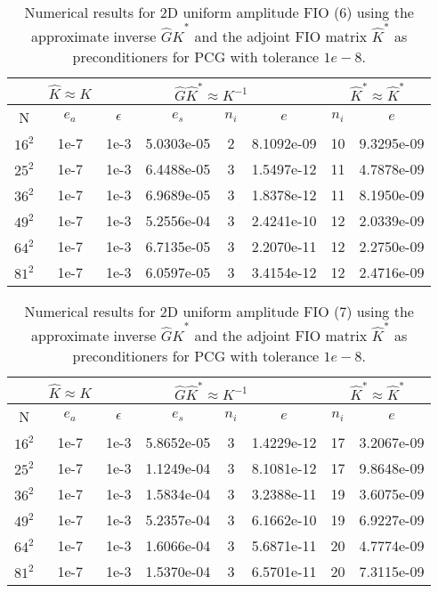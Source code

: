 \documentclass[11pt]{article}
\begin{document}
\begin{table}[!htbp]
\centering
\begin{tabular}{|c|c|c|c|c|c|c|c|}
\hline
\multicolumn{1}{c|}{}& \multicolumn{1}{c|}{$\hat{K} \approx K$} & \multicolumn{4}{c|}{$\hat{G}\hat{K}^{*}\approx K^{-1}$}& \multicolumn{2}{c|}{$\hat{K}^{*} \approx \hat{K}^{*}$}\\
\hline
N & $e_{a}$ & $\epsilon$ & $e_{s}$ & $n_{i}$ & $e$ & $n_{i}$ & $e$ \\ 
\hline
$16^2$ & 1e-7 & 1e-3 & 5.0303e-05 & 2 & 8.1092e-09 & 10 & 9.3295e-09 \\
\hline
$25^2$ & 1e-7 & 1e-3 & 6.4488e-05 & 3 & 1.5497e-12 & 11 & 4.7878e-09 \\
\hline
$36^2$ & 1e-7 & 1e-3 & 6.9689e-05 & 3 & 1.8378e-12 & 11 & 8.1950e-09 \\
\hline
$49^2$ & 1e-7 & 1e-3 & 5.2556e-04 & 3 & 2.4241e-10 & 12 & 2.0339e-09 \\
\hline
$64^2$ & 1e-7 & 1e-3 & 6.7135e-05 & 3 & 2.2070e-11 & 12 & 2.2750e-09 \\
\hline
$81^2$ & 1e-7 & 1e-3 & 6.0597e-05 & 3 & 3.4154e-12 & 12 & 2.4716e-09 \\

\end{tabular}

\caption{Numerical results for 2D uniform amplitude FIO (6) using the approximate inverse $\hat{G}\hat{K}^{*}$ and the adjoint FIO matrix $\hat{K}^{*}$ as preconditioners for PCG with tolerance $1e-8$.}
\label{2d-k1}
\end{table}

\begin{table}[!htbp]
\centering
\begin{tabular}{|c|c|c|c|c|c|c|c|}
\hline
\multicolumn{1}{c|}{}& \multicolumn{1}{c|}{$\hat{K} \approx K$} & \multicolumn{4}{c|}{$\hat{G}\hat{K}^{*}\approx K^{-1}$}& \multicolumn{2}{c|}{$\hat{K}^{*} \approx \hat{K}^{*}$}\\
\hline
N & $e_{a}$ & $\epsilon$ & $e_{s}$ & $n_{i}$ & $e$ & $n_{i}$ & $e$ \\ 
\hline
$16^2$ & 1e-7 & 1e-3 & 5.8652e-05 & 3 & 1.4229e-12 & 17 & 3.2067e-09 \\
\hline
$25^2$ & 1e-7 & 1e-3 & 1.1249e-04 & 3 & 8.1081e-12 & 17 & 9.8648e-09 \\
\hline
$36^2$ & 1e-7 & 1e-3 & 1.5834e-04 & 3 & 3.2388e-11 & 19 & 3.6075e-09 \\
\hline
$49^2$ & 1e-7 & 1e-3 & 5.2357e-04 & 3 & 6.1662e-10 & 19 & 6.9227e-09 \\
\hline
$64^2$ & 1e-7 & 1e-3 & 1.6066e-04 & 3 & 5.6871e-11 & 20 & 4.7774e-09 \\
\hline
$81^2$ & 1e-7 & 1e-3 & 1.5370e-04 & 3 & 6.5701e-11 & 20 & 7.3115e-09 \\

\end{tabular}

\caption{Numerical results for 2D uniform amplitude FIO (7) using the approximate inverse $\hat{G}\hat{K}^{*}$ and the adjoint FIO matrix $\hat{K}^{*}$ as preconditioners for PCG with tolerance $1e-8$.}
\label{2d-k2}
\end{table}
\end{document}
